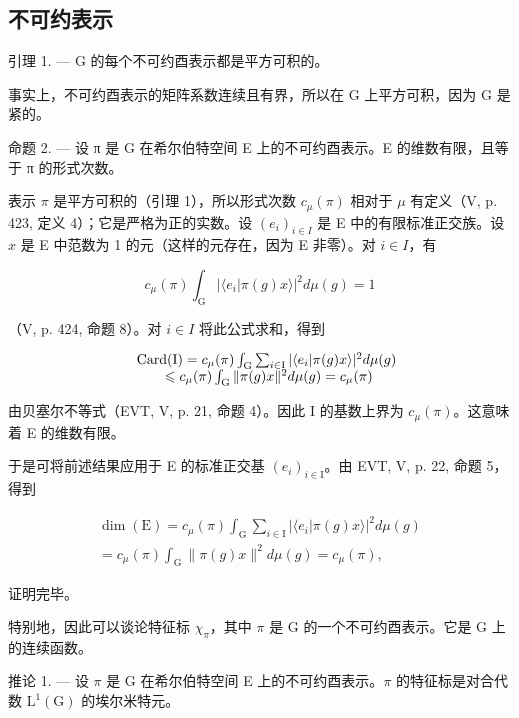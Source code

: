 \subsection{不可约表示}

引理 1. --- G 的每个不可约酉表示都是平方可积的。

事实上，不可约酉表示的矩阵系数连续且有界，所以在 G 上平方可积，因为 G 是紧的。

命题 2. --- 设 π 是 G 在希尔伯特空间 E 上的不可约酉表示。E 的维数有限，且等于 π 的形式次数。

表示 \(\pi\) 是平方可积的（引理 1），所以形式次数 \(c_{\mu}(\pi)\) 相对于 \(\mu\) 有定义（V, p. 423, 定义 4）；它是严格为正的实数。设 \((e_i)_{i \in I}\) 是 E 中的有限标准正交族。设 \(x\) 是 E 中范数为 1 的元（这样的元存在，因为 E 非零）。对 \(i \in I\)，有

\[
c _ {\mu} (\pi) \int_ {\mathrm{G}} | \langle e _ {i} | \pi (g) x \rangle | ^ {2} d \mu (g) = 1
\]

（V, p. 424, 命题 8）。对 \(i \in I\) 将此公式求和，得到

\[
\begin{array}{r l} & {\mathrm{Card(I)} = c _ {\mu} (\pi) \int_ {\mathrm{G}} \sum_ {i \in \mathrm{I}} | \langle e _ {i} | \pi (g) x \rangle | ^ {2} d \mu (g)} \\ & {\qquad \leqslant c _ {\mu} (\pi) \int_ {\mathrm{G}} \| \pi (g) x \| ^ {2} d \mu (g) = c _ {\mu} (\pi)} \end{array}
\]

由贝塞尔不等式（EVT, V, p. 21, 命题 4）。因此 I 的基数上界为 \(c_{\mu}(\pi)\)。这意味着 E 的维数有限。

于是可将前述结果应用于 E 的标准正交基 \((e_{i})_{i\in\mathrm{I}}\)。由 EVT, V, p. 22, 命题 5，得到

\[
\begin{array}{r} \dim (\mathrm{E}) = c _ {\mu} (\pi) \int_ {\mathrm{G}} \sum_ {i \in \mathrm{I}} | \langle e _ {i} | \pi (g) x \rangle | ^ {2} d \mu (g) \\ = c _ {\mu} (\pi) \int_ {\mathrm{G}} \| \pi (g) x \| ^ {2} d \mu (g) = c _ {\mu} (\pi), \end{array}
\]

证明完毕。

特别地，因此可以谈论特征标 \(\chi_{\pi}\)，其中 \(\pi\) 是 G 的一个不可约酉表示。它是 G 上的连续函数。

推论 1. --- 设 \(\pi\) 是 G 在希尔伯特空间 E 上的不可约酉表示。\(\pi\) 的特征标是对合代数 \(\mathrm{L}^{1}(\mathrm{G})\) 的埃尔米特元。

